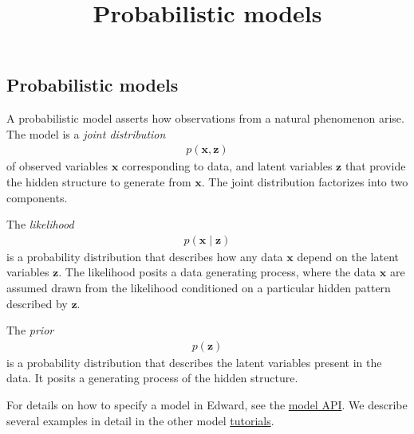 \title{Probabilistic models}

\subsection{Probabilistic models}

A probabilistic model asserts how observations from a natural phenomenon arise.
The model is a \emph{joint distribution}
\begin{align*}
  p(\mathbf{x}, \mathbf{z})
\end{align*}
of observed variables $\mathbf{x}$ corresponding to data, and latent
variables $\mathbf{z}$ that provide the hidden structure to generate
from $\mathbf{x}$. The joint distribution factorizes into two
components.

The \emph{likelihood}
\begin{align*}
  p(\mathbf{x} \mid \mathbf{z})
\end{align*}
is a probability distribution that describes how any data $\mathbf{x}$
depend on the latent variables $\mathbf{z}$. The likelihood posits a
data generating process, where the data $\mathbf{x}$ are assumed drawn
from the likelihood conditioned on a particular hidden pattern
described by $\mathbf{z}$.

The \emph{prior}
\begin{align*}
  p(\mathbf{z})
\end{align*}
is a probability distribution that describes the latent variables
present in the data. It posits a generating process of the hidden structure.

For details on how to specify a model in Edward, see the
\href{/api/model}{model API}. We describe several examples in detail
in the
other model \href{/tutorials/}{tutorials}.
